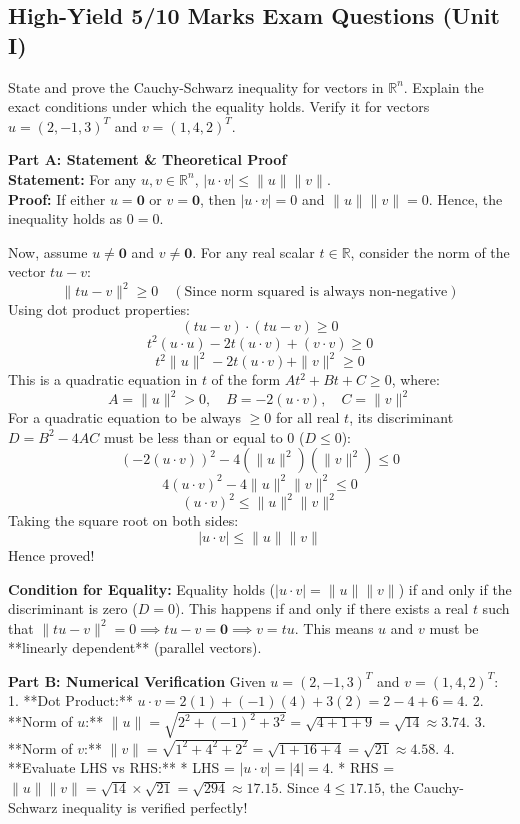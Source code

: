 \documentclass[11pt,a4paper]{article}
\begin{document}
\subsection{High-Yield 5/10 Marks Exam Questions (Unit I)}

\begin{questionbox}
State and prove the Cauchy-Schwarz inequality for vectors in $\mathbb{R}^n$. Explain the exact conditions under which the equality holds. Verify it for vectors $u = (2, -1, 3)^T$ and $v = (1, 4, 2)^T$.
\end{questionbox}

\begin{solutionbox}
\textbf{Part A: Statement \& Theoretical Proof}
\\
\textbf{Statement:} For any $u, v \in \mathbb{R}^n$, $|u \cdot v| \le \|u\| \|v\|$.
\\
\textbf{Proof:} 
If either $u = \mathbf{0}$ or $v = \mathbf{0}$, then $|u \cdot v| = 0$ and $\|u\| \|v\| = 0$. Hence, the inequality holds as $0 = 0$.

Now, assume $u \neq \mathbf{0}$ and $v \neq \mathbf{0}$. For any real scalar $t \in \mathbb{R}$, consider the norm of the vector $t u - v$:
\[ \|t u - v\|^2 \ge 0 \quad (\text{Since norm squared is always non-negative}) \]
Using dot product properties:
\[ (t u - v) \cdot (t u - v) \ge 0 \]
\[ t^2 (u \cdot u) - 2t (u \cdot v) + (v \cdot v) \ge 0 \]
\[ t^2 \|u\|^2 - 2t (u \cdot v) + \|v\|^2 \ge 0 \]
This is a quadratic equation in $t$ of the form $A t^2 + B t + C \ge 0$, where:
\[ A = \|u\|^2 > 0, \quad B = -2(u \cdot v), \quad C = \|v\|^2 \]
For a quadratic equation to be always $\ge 0$ for all real $t$, its discriminant $D = B^2 - 4AC$ must be less than or equal to $0$ ($D \le 0$):
\[ (-2(u \cdot v))^2 - 4 (\|u\|^2) (\|v\|^2) \le 0 \]
\[ 4 (u \cdot v)^2 - 4 \|u\|^2 \|v\|^2 \le 0 \]
\[ (u \cdot v)^2 \le \|u\|^2 \|v\|^2 \]
Taking the square root on both sides:
\[ |u \cdot v| \le \|u\| \|v\| \]
Hence proved!

\textbf{Condition for Equality:} 
Equality holds ($|u \cdot v| = \|u\| \|v\|$) if and only if the discriminant is zero ($D = 0$). This happens if and only if there exists a real $t$ such that $\|t u - v\|^2 = 0 \implies t u - v = \mathbf{0} \implies v = t u$.
This means $u$ and $v$ must be **linearly dependent** (parallel vectors).

\textbf{Part B: Numerical Verification}
Given $u = (2, -1, 3)^T$ and $v = (1, 4, 2)^T$:
1. **Dot Product:** $u \cdot v = 2(1) + (-1)(4) + 3(2) = 2 - 4 + 6 = 4$.
2. **Norm of $u$:** $\|u\| = \sqrt{2^2 + (-1)^2 + 3^2} = \sqrt{4 + 1 + 9} = \sqrt{14} \approx 3.74$.
3. **Norm of $v$:** $\|v\| = \sqrt{1^2 + 4^2 + 2^2} = \sqrt{1 + 16 + 4} = \sqrt{21} \approx 4.58$.
4. **Evaluate LHS vs RHS:**
   * LHS = $|u \cdot v| = |4| = 4$.
   * RHS = $\|u\| \|v\| = \sqrt{14} \times \sqrt{21} = \sqrt{294} \approx 17.15$.
   Since $4 \le 17.15$, the Cauchy-Schwarz inequality is verified perfectly!
\end{solutionbox}
\end{document}
